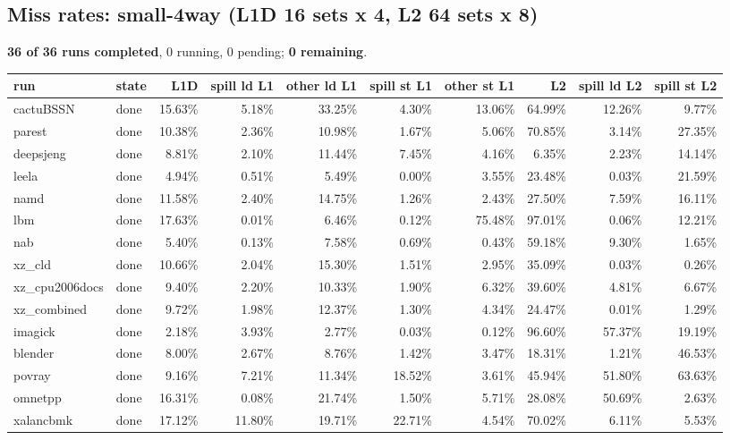 \documentclass[10pt,a4paper,landscape]{article}
\begin{document}
\subsection*{Miss rates: small-4way (L1D 16 sets x 4, L2 64 sets x 8)}
\textbf{36 of 36 runs completed}, 0 running, 0 pending; \textbf{0 remaining}.\par
{\footnotesize
\begin{longtable}{llrrrrrrrr}
\toprule
run & state & L1D & spill ld L1 & other ld L1 & spill st L1 & other st L1 & L2 & spill ld L2 & spill st L2 \\
\midrule
\endhead
\bottomrule
\endfoot
cactuBSSN & done & 15.63\% & 5.18\% & 33.25\% & 4.30\% & 13.06\% & 64.99\% & 12.26\% & 9.77\% \\
parest & done & 10.38\% & 2.36\% & 10.98\% & 1.67\% & 5.06\% & 70.85\% & 3.14\% & 27.35\% \\
deepsjeng & done & 8.81\% & 2.10\% & 11.44\% & 7.45\% & 4.16\% & 6.35\% & 2.23\% & 14.14\% \\
leela & done & 4.94\% & 0.51\% & 5.49\% & 0.00\% & 3.55\% & 23.48\% & 0.03\% & 21.59\% \\
namd & done & 11.58\% & 2.40\% & 14.75\% & 1.26\% & 2.43\% & 27.50\% & 7.59\% & 16.11\% \\
lbm & done & 17.63\% & 0.01\% & 6.46\% & 0.12\% & 75.48\% & 97.01\% & 0.06\% & 12.21\% \\
nab & done & 5.40\% & 0.13\% & 7.58\% & 0.69\% & 0.43\% & 59.18\% & 9.30\% & 1.65\% \\
xz\_cld & done & 10.66\% & 2.04\% & 15.30\% & 1.51\% & 2.95\% & 35.09\% & 0.03\% & 0.26\% \\
xz\_cpu2006docs & done & 9.40\% & 2.20\% & 10.33\% & 1.90\% & 6.32\% & 39.60\% & 4.81\% & 6.67\% \\
xz\_combined & done & 9.72\% & 1.98\% & 12.37\% & 1.30\% & 4.34\% & 24.47\% & 0.01\% & 1.29\% \\
imagick & done & 2.18\% & 3.93\% & 2.77\% & 0.03\% & 0.12\% & 96.60\% & 57.37\% & 19.19\% \\
blender & done & 8.00\% & 2.67\% & 8.76\% & 1.42\% & 3.47\% & 18.31\% & 1.21\% & 46.53\% \\
povray & done & 9.16\% & 7.21\% & 11.34\% & 18.52\% & 3.61\% & 45.94\% & 51.80\% & 63.63\% \\
omnetpp & done & 16.31\% & 0.08\% & 21.74\% & 1.50\% & 5.71\% & 28.08\% & 50.69\% & 2.63\% \\
xalancbmk & done & 17.12\% & 11.80\% & 19.71\% & 22.71\% & 4.54\% & 70.02\% & 6.11\% & 5.53\% \\

\end{longtable}}
\end{document}
